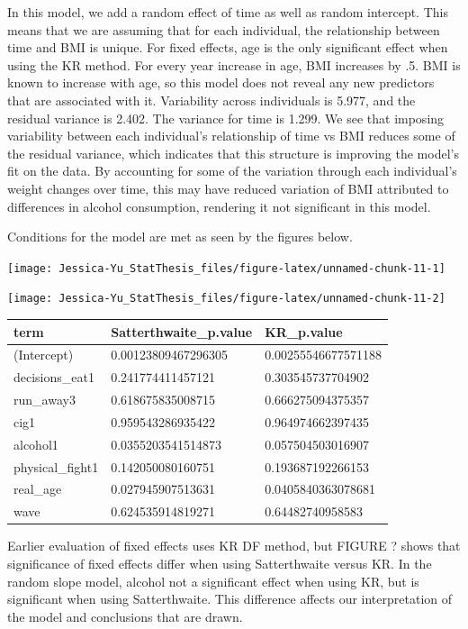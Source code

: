 \documentclass[12pt, twoside]{amherstthesis}
\begin{document}
In this model, we add a random effect of time as well as random intercept. This means that we are assuming that for each individual, the relationship between time and BMI is unique. For fixed effects, age is the only significant effect when using the KR method. For every year increase in age, BMI increases by .5. BMI is known to increase with age, so this model does not reveal any new predictors that are associated with it. Variability across individuals is 5.977, and the residual variance is 2.402. The variance for time is 1.299. We see that imposing variability between each individual's relationship of time vs BMI reduces some of the residual variance, which indicates that this structure is improving the model's fit on the data. By accounting for some of the variation through each individual's weight changes over time, this may have reduced variation of BMI attributed to differences in alcohol consumption, rendering it not significant in this model.

Conditions for the model are met as seen by the figures below.
\begin{center}\texttt{[image: Jessica-Yu\_StatThesis\_files/figure-latex/unnamed-chunk-11-1]} \end{center}
\begin{center}\texttt{[image: Jessica-Yu\_StatThesis\_files/figure-latex/unnamed-chunk-11-2]} \end{center}
\begin{tabular}{l|l|l}
\hline
term & Satterthwaite\_p.value & KR\_p.value\\
\hline
(Intercept) & 0.00123809467296305 & 0.00255546677571188\\
\hline
decisions\_eat1 & 0.241774411457121 & 0.303545737704902\\
\hline
run\_away3 & 0.618675835008715 & 0.666275094375357\\
\hline
cig1 & 0.959543286935422 & 0.964974662397435\\
\hline
alcohol1 & 0.0355203541514873 & 0.057504503016907\\
\hline
physical\_fight1 & 0.142050080160751 & 0.193687192266153\\
\hline
real\_age & 0.027945907513631 & 0.0405840363078681\\
\hline
wave & 0.624535914819271 & 0.64482740958583\\
\hline
\end{tabular}
Earlier evaluation of fixed effects uses KR DF method, but FIGURE ? shows that significance of fixed effects differ when using Satterthwaite versus KR. In the random slope model, alcohol not a significant effect when using KR, but is significant when using Satterthwaite. This difference affects our interpretation of the model and conclusions that are drawn.
\end{document}
